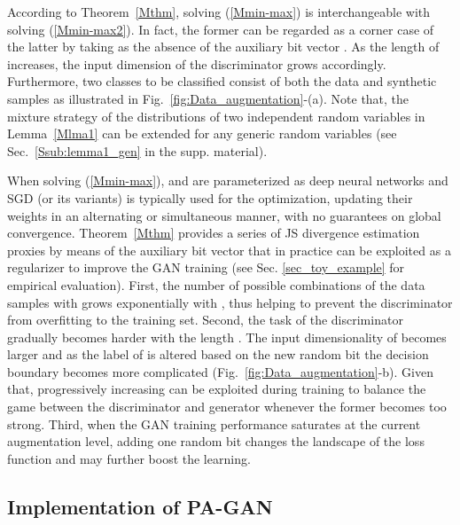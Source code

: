 \documentclass{article}
\begin{document}
According to Theorem~\ref{Mthm}, solving (\ref{Mmin-max}) is interchangeable with solving (\ref{Mmin-max2}). In fact, the former can be regarded as a corner case of the latter by taking  as the absence of the auxiliary bit vector . As the length  of  increases, the input dimension of the discriminator grows accordingly. Furthermore, two classes to be classified consist of both the data and synthetic samples as illustrated in Fig.~\ref{fig:Data_augmentation}-(a).  Note that, the mixture strategy of the distributions of two independent random variables in Lemma~\ref{Mlma1} can be extended for any generic random variables (see Sec.~\ref{Ssub:lemma1_gen} in the supp. material). 

When solving (\ref{Mmin-max}),  and  are parameterized as deep neural networks and SGD (or its variants) is typically used for the optimization, updating their weights in an alternating or simultaneous manner, with no guarantees on global convergence. 
Theorem~\ref{Mthm} provides a series of JS divergence estimation proxies by means of the auxiliary bit vector  that in practice can be exploited as a regularizer to improve the GAN training (see Sec. \ref{sec_toy_example} for empirical evaluation). First, the number of possible combinations of the data samples with  grows exponentially with , thus helping to prevent the discriminator from overfitting to the training set. Second, the task of the discriminator gradually becomes harder with the length . The input dimensionality of  becomes larger and as the label of  is altered based on the new random bit  the decision boundary becomes more complicated (Fig.~\ref{fig:Data_augmentation}-b). Given that, progressively increasing  can be exploited during training to balance the game between the discriminator and generator whenever the former becomes too strong. Third, when the GAN training performance saturates at the current augmentation level, adding one random bit changes the landscape of the loss function and may further boost the learning.



 \subsection{Implementation of PA-GAN} \label{subsec:implement}
\end{document}
